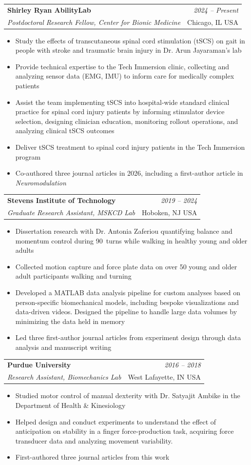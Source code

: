 \documentclass[letterpaper,11pt]{article}
\makeatletter
\newcommand{\resumeSubheading}[4]{
\vspace{0.5mm}\item
    \begin{tabular*}{0.98\textwidth}[t]{l@{\extracolsep{\fill}}r}
        \textbf{#1} & \textit{\footnotesize{#4}} \\
        \textit{\footnotesize{#3}} &  \footnotesize{#2}\\
    \end{tabular*}
    \vspace{-2.4mm}
}
\newcommand{\resumeItemListStart}{\begin{itemize}[leftmargin=*,labelsep=1mm,itemsep=0.5mm]}
\newcommand{\resumeItemListEnd}{\end{itemize}\vspace{-2mm}}
\makeatother
\begin{document}
\resumeSubheading
  {Shirley Ryan AbilityLab}{Chicago, IL USA}
  {Postdoctoral Research Fellow, Center for Bionic Medicine}{2024 -- Present}
\resumeItemListStart
  \item Study the effects of transcutaneous spinal cord stimulation (tSCS) on gait in people with stroke and traumatic brain injury in Dr. Arun Jayaraman's lab
  \item Provide technical expertise to the Tech Immersion clinic, collecting and analyzing sensor data (EMG, IMU) to inform care for medically complex patients
  \item Assist the team implementing tSCS into hospital-wide standard clinical practice for spinal cord injury patients by informing stimulator device selection, designing clinician education, monitoring rollout operations, and analyzing clinical tSCS outcomes
  \item Deliver tSCS treatment to spinal cord injury patients in the Tech Immersion program
  \item Co-authored three journal articles in 2026, including a first-author article in \textit{Neuromodulation}
\resumeItemListEnd

\resumeSubheading
  {Stevens Institute of Technology}{Hoboken, NJ USA}
  {Graduate Research Assistant, MSKCD Lab}{2019 -- 2024}
\resumeItemListStart
  \item Dissertation research with Dr. Antonia Zaferiou quantifying balance and momentum control during 90\degree~turns while walking in healthy young and older adults
  \item Collected motion capture and force plate data on over 50 young and older adult participants walking and turning
  \item Developed a MATLAB data analysis pipeline for custom analyses based on person-specific biomechanical models, including bespoke visualizations and data-driven videos. Designed the pipeline to handle large data volumes by minimizing the data held in memory
  \item Led three first-author journal articles from experiment design through data analysis and manuscript writing
\resumeItemListEnd

\resumeSubheading
  {Purdue University}{West Lafayette, IN USA}
  {Research Assistant, Biomechanics Lab}{2016 -- 2018}
\resumeItemListStart
  \item Studied motor control of manual dexterity with Dr. Satyajit Ambike in the Department of Health \& Kinesiology
  \item Helped design and conduct experiments to understand the effect of anticipation on stability in a finger force-production task, acquiring force transducer data and analyzing movement variability.
  \item First-authored three journal articles from this work
\resumeItemListEnd
\end{document}
